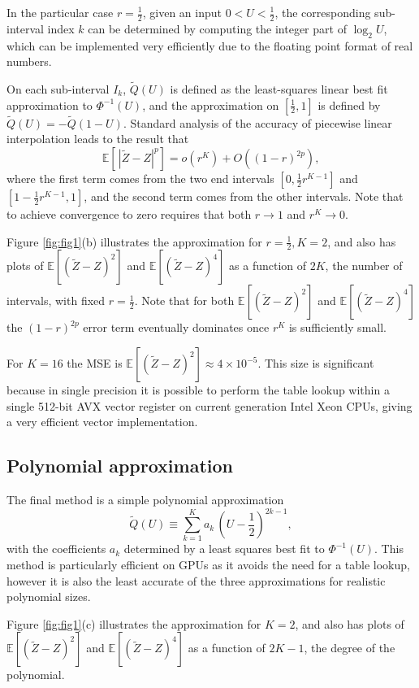 \documentclass[review]{siamart190516}
\def \EE {{\mathbb{E}}}
\def \tQ {{\widetilde{Q}}}
\def \tZ {{\widetilde{Z}}}
\newcommand{\fracs}[2]{{\textstyle \frac{#1}{#2}}}
\begin{document}
In the particular case $r\!=\!\fracs{1}{2}$, given an input $0\!<\!U\!<\!\fracs{1}{2}$, 
the corresponding sub-interval index $k$ can be determined by computing the integer 
part of $\log_2U$, which can be implemented very efficiently due to the floating 
point format of real numbers.

On each sub-interval $I_k$, $\tQ(U)$ is defined as the least-squares linear best 
fit approximation to $\Phi^{-1}(U)$, and the approximation on $[\fracs{1}{2},1]$ 
is defined by $\tQ(U) = - \tQ(1{-}U)$.  Standard analysis of the accuracy of
piecewise linear interpolation leads to the result that
\[
\EE[\, |\tZ{-}Z|^p] = o(r^K) + O( (1{-}r)^{2p}),
\]
where the first term comes from the two end intervals $[0,\fracs{1}{2} r^{K-1}]$ 
and $[1{-}\fracs{1}{2} r^{K-1}, 1]$, and the second term comes from the other intervals.
Note that to achieve convergence to zero requires that both $r\rightarrow 1$
and $r^K\rightarrow 0$.

Figure \ref{fig:fig1}(b) illustrates the approximation for 
$r\!=\!\fracs{1}{2} , K\!=\!2$, 
and also has plots of $\EE[(\tZ{-}Z)^2]$ and $\EE[(\tZ{-}Z)^4]$ 
as a function of $2K$,  the number of intervals, with fixed
$r\!=\!\fracs{1}{2}$.  Note that for both $\EE[(\tZ{-}Z)^2]$
and $\EE[(\tZ{-}Z)^4]$ the $(1{-}r)^{2p}$ error term eventually
dominates once $r^K$ is sufficiently small.

For $K\!=\!16$ the MSE is
$\EE[(\tZ{-}Z)^2]\!\approx\! 4\!\times\! 10^{-5}$.
This size is significant because in single precision it is possible to 
perform the table lookup within a single 512-bit AVX vector register on 
current generation Intel Xeon CPUs, giving a very efficient vector 
implementation.

\subsection{Polynomial approximation}

The final method is a simple polynomial approximation
\[
\tQ(U) \equiv \sum_{k=1}^K a_k\, (U{-}\fracs{1}{2})^{2k-1},
\]
with the coefficients $a_k$ determined by a least squares best fit 
to $\Phi^{-1}(U)$.  This method is particularly efficient on GPUs 
as it avoids the need for a table lookup, however it is also the 
least accurate of the three approximations for realistic polynomial sizes.

Figure \ref{fig:fig1}(c) illustrates the approximation for $K\!=\!2$, 
and also has plots of $\EE[(\tZ{-}Z)^2]$ and $\EE[(\tZ{-}Z)^4]$ 
as a function of $2K{-}1$, the degree of the polynomial.
\end{document}
